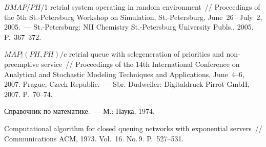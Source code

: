 \begin{multicols}{2}
{{\begin{thebibliography}{99}
$BM\!AP$/$PH$/1 retrial system operating in random environment~// Proceedings of 
the 5th St.-Petersburg Workshop on Simulation, St.-Petersburg, June~26\,--\,July~2, 
2005.~--- St.-Petersburg: NII Chemistry St.-Petersburg University Publs., 
2005. P.~367--372.   

$M\!AP\vert (PH,PH)/c$ retrial queue with selegeneration of priorities 
and non-preemptive service~// Proceedings of the 14th International Conference on 
Analytical and Stochastic Modeling Techniques and Applications, June~4--6, 
2007. Prague, Czech Republic.~--- Sbr.-Dudweiler: Digitaldruck Pirrot GmbH, 
2007. P.~70--74.

Справочник по математике.~--- М.: Наука, 1974.

\label{end\stat}


Computational algorithm for closed queuing networks with exponential servers~// 
Communications ACM, 1973. Vol.~16. No.\,9. P.~527--531.
 \end{thebibliography}
}
}
\end{multicols}
 
 
 